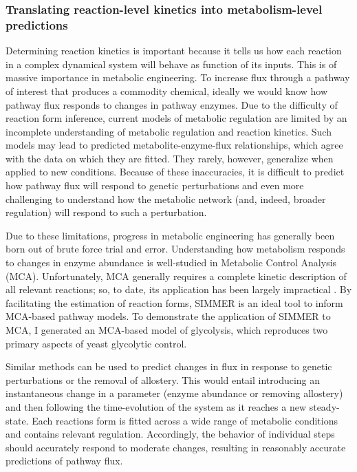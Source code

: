 \subsubsection{Translating reaction-level kinetics into metabolism-level predictions}

Determining reaction kinetics is important because it tells us how each reaction in a complex dynamical system will behave as function of its inputs. This is of massive importance in metabolic engineering. To increase flux through a pathway of interest that produces a commodity chemical, ideally we would know how pathway flux responds to changes in pathway enzymes. Due to the difficulty of reaction form inference, current models of metabolic regulation are limited by an incomplete understanding of metabolic regulation and reaction kinetics. Such models may lead to predicted metabolite-enzyme-flux relationships, which agree with the data on which they are fitted. They rarely, however, generalize when applied to new conditions. Because of these inaccuracies, it is difficult to predict how pathway flux will respond to genetic perturbations and even more challenging to understand how the metabolic network (and, indeed, broader regulation) will respond to such a perturbation. 

Due to these limitations, progress in metabolic engineering has generally been born out of brute force trial and error. Understanding how metabolism responds to changes in enzyme abundance is well-studied in Metabolic Control Analysis (MCA). Unfortunately, MCA generally requires a complete kinetic description of all relevant reactions; so, to date, its application has been largely impractical \cite{Kacser:1973fe, Fell:1997wg}. By facilitating the estimation of reaction forms, SIMMER is an ideal tool to inform MCA-based pathway models. To demonstrate the application of SIMMER to MCA, I generated an MCA-based model of glycolysis, which reproduces two primary aspects of yeast glycolytic control.

Similar methods can be used to predict changes in flux in response to genetic perturbations or the removal of allostery. This would entail introducing an instantaneous change in a parameter (enzyme abundance or removing allostery) and then following the time-evolution of the system as it reaches a new steady-state. Each reactions form is fitted across a wide range of metabolic conditions and contains relevant regulation. Accordingly, the behavior of individual steps should accurately respond to moderate changes, resulting in reasonably accurate predictions of pathway flux.

